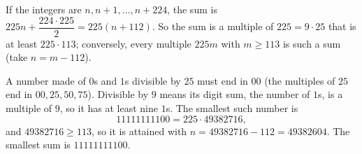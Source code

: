 If the integers are $n,n+1,\dots,n+224$, the sum is $225n+\dfrac{224\cdot225}{2}=225(n+112)$. So the sum is a multiple of $225=9\cdot25$ that is at least $225\cdot113$; conversely, every multiple $225m$ with $m\ge113$ is such a sum (take $n=m-112$).

A number made of $0$s and $1$s divisible by $25$ must end in $00$ (the multiples of $25$ end in $00,25,50,75$). Divisible by $9$ means its digit sum, the number of $1$s, is a multiple of $9$, so it has at least nine $1$s. The smallest such number is
\[
11111111100=225\cdot49382716 ,
\]
and $49382716\ge113$, so it is attained with $n=49382716-112=49382604$. The smallest sum is $\boxed{11111111100}$.
